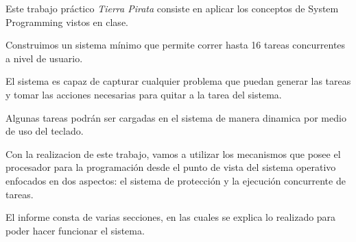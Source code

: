 Este trabajo pr\'actico \textit{Tierra Pirata} consiste en aplicar los conceptos de System Programming vistos en clase.

Construimos un sistema m\'inimo que permite correr hasta 16 tareas concurrentes a nivel de usuario.

El sistema es capaz de capturar cualquier problema que puedan generar las tareas y tomar las acciones necesarias para quitar a la tarea del sistema.

Algunas tareas podr\'an ser cargadas en el sistema de manera dinamica por medio de uso del teclado.

Con la realizacion de este trabajo, vamos a utilizar los mecanismos que posee el procesador para la programaci\'on desde el punto de vista del sistema operativo enfocados en dos aspectos: el sistema de protecci\'on y la ejecuci\'on concurrente de tareas.

El informe consta de varias secciones, en las cuales se explica lo realizado para poder hacer funcionar el sistema.
